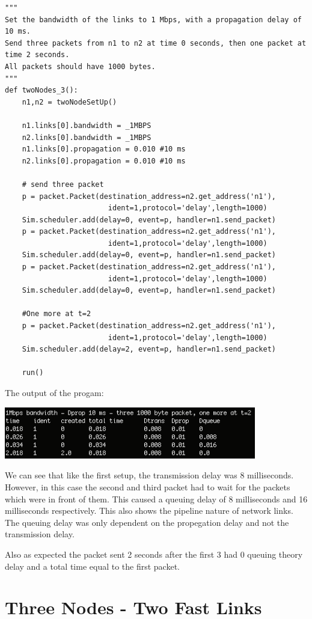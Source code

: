 \documentclass[11pt]{article}
\begin{document}
\begin{lstlisting}
"""
Set the bandwidth of the links to 1 Mbps, with a propagation delay of 10 ms. 
Send three packets from n1 to n2 at time 0 seconds, then one packet at time 2 seconds. 
All packets should have 1000 bytes.
"""
def twoNodes_3():
    n1,n2 = twoNodeSetUp()

    n1.links[0].bandwidth = _1MBPS
    n2.links[0].bandwidth = _1MBPS
    n1.links[0].propagation = 0.010 #10 ms
    n2.links[0].propagation = 0.010 #10 ms

    # send three packet
    p = packet.Packet(destination_address=n2.get_address('n1'),
                        ident=1,protocol='delay',length=1000)
    Sim.scheduler.add(delay=0, event=p, handler=n1.send_packet)
    p = packet.Packet(destination_address=n2.get_address('n1'),
                        ident=1,protocol='delay',length=1000)
    Sim.scheduler.add(delay=0, event=p, handler=n1.send_packet)
    p = packet.Packet(destination_address=n2.get_address('n1'),
                        ident=1,protocol='delay',length=1000)
    Sim.scheduler.add(delay=0, event=p, handler=n1.send_packet)

    #One more at t=2
    p = packet.Packet(destination_address=n2.get_address('n1'),
                        ident=1,protocol='delay',length=1000)
    Sim.scheduler.add(delay=2, event=p, handler=n1.send_packet)

    run()
\end{lstlisting}
The output of the progam:

\includegraphics[width=11cm]{twoNode-3.png}

We can see that like the first setup, the transmission delay was 8 milliseconds. However, in this case the second and third packet had to wait for the packets which were in front of them. This caused a queuing delay of 8 milliseconds and 16 milliseconds respectively. This also shows the pipeline nature of network links. The queuing delay was only dependent on the propegation delay and not the transmission delay. 

Also as expected the packet sent 2 seconds after the first 3 had 0 queuing theory delay and a total time equal to the first packet.

\section{Three Nodes - Two Fast Links}
\end{document}
